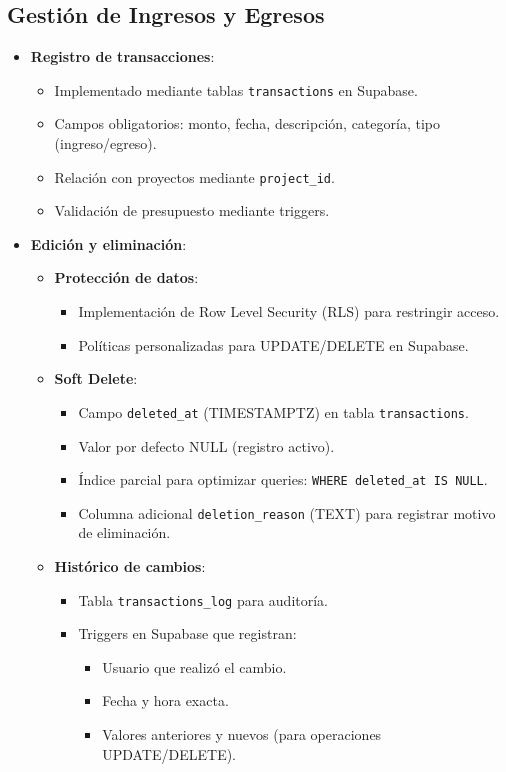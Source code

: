 \subsection{Gestión de Ingresos y Egresos}
\begin{itemize}
    \item \textbf{Registro de transacciones}:
    \begin{itemize}
        \item Implementado mediante tablas \texttt{transactions} en Supabase.
        \item Campos obligatorios: monto, fecha, descripción, categoría, tipo (ingreso/egreso).
        \item Relación con proyectos mediante \texttt{project\_id}.
        \item Validación de presupuesto mediante triggers.
    \end{itemize}
    
    \item \textbf{Edición y eliminación}:
    \begin{itemize}
        \item \textbf{Protección de datos}:
        \begin{itemize}
            \item Implementación de Row Level Security (RLS) para restringir acceso.
            \item Políticas personalizadas para UPDATE/DELETE en Supabase.
        \end{itemize}
        
        \item \textbf{Soft Delete}:
        \begin{itemize}
            \item Campo \texttt{deleted\_at} (TIMESTAMPTZ) en tabla \texttt{transactions}.
            \item Valor por defecto NULL (registro activo).
            \item Índice parcial para optimizar queries: \texttt{WHERE deleted\_at IS NULL}.
            \item Columna adicional \texttt{deletion\_reason} (TEXT) para registrar motivo de eliminación.
        \end{itemize}
        
        \item \textbf{Histórico de cambios}:
        \begin{itemize}
            \item Tabla \texttt{transactions\_log} para auditoría.
            \item Triggers en Supabase que registran:
            \begin{itemize}
                \item Usuario que realizó el cambio.
                \item Fecha y hora exacta.
                \item Valores anteriores y nuevos (para operaciones UPDATE/DELETE).
            \end{itemize}
        \end{itemize}
    \end{itemize}
    

\end{itemize}
